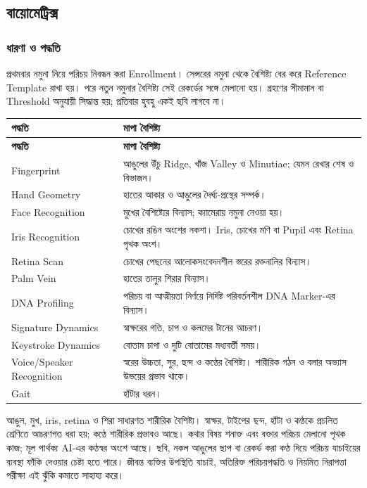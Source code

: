 \subsection{বায়োমেট্রিক্স}
\label{sec:ch1-biometrics}
\subsubsection{ধারণা ও পদ্ধতি}
প্রথমবার নমুনা নিয়ে পরিচয় নিবন্ধন করা Enrollment। সেন্সরের নমুনা থেকে বৈশিষ্ট্য বের করে Reference Template রাখা হয়। পরে নতুন নমুনার বৈশিষ্ট্য সেই রেকর্ডের সঙ্গে মেলানো হয়। গ্রহণের সীমামান বা Threshold অনুযায়ী সিদ্ধান্ত হয়; প্রতিবার হুবহু একই ছবি লাগবে না।
\begin{compacttable}
\begin{longtable}{|p{}|p{}|}
\hline\textbf{পদ্ধতি} & \textbf{মাপা বৈশিষ্ট্য}\\\hline\endfirsthead
\hline\textbf{পদ্ধতি} & \textbf{মাপা বৈশিষ্ট্য}\\\hline\endhead
Fingerprint & আঙুলের উঁচু Ridge, খাঁজ Valley ও Minutiae; যেমন রেখার শেষ ও বিভাজন।\\\hline
Hand Geometry & হাতের আকার ও আঙুলের দৈর্ঘ্য-প্রস্থের সম্পর্ক।\\\hline
Face Recognition & মুখের বৈশিষ্ট্যের বিন্যাস; ক্যামেরায় নমুনা নেওয়া হয়।\\\hline
Iris Recognition & চোখের রঙিন অংশের নকশা। Iris, চোখের মণি বা Pupil এবং Retina পৃথক অংশ।\\\hline
Retina Scan & চোখের পেছনের আলোকসংবেদনশীল স্তরের রক্তনালির বিন্যাস।\\\hline
Palm Vein & হাতের তালুর শিরার বিন্যাস।\\\hline
DNA Profiling & পরিচয় বা আত্মীয়তা নির্ণয়ে নির্দিষ্ট পরিবর্তনশীল DNA Marker-এর বিন্যাস।\\\hline
Signature Dynamics & স্বাক্ষরের গতি, চাপ ও কলমের টানের আচরণ।\\\hline
Keystroke Dynamics & বোতাম চাপা ও দুটি বোতামের মধ্যবর্তী সময়।\\\hline
Voice/Speaker Recognition & স্বরের উচ্চতা, সুর, ছন্দ ও কণ্ঠের বৈশিষ্ট্য। শারীরিক গঠন ও বলার অভ্যাস উভয়ের প্রভাব থাকে।\\\hline
Gait & হাঁটার ধরন।\\\hline
\end{longtable}
\end{compacttable}
আঙুল, মুখ, iris, retina ও শিরা সাধারণত শারীরিক বৈশিষ্ট্য। স্বাক্ষর, টাইপের ছন্দ, হাঁটা ও কণ্ঠকে প্রচলিত শ্রেণিতে আচরণগত ধরা হয়; কণ্ঠে শারীরিক প্রভাবও আছে। কথার বিষয় শনাক্ত এবং বক্তার পরিচয় মেলানো পৃথক কাজ; মূল পার্থক্য AI-এর কণ্ঠস্বর অংশে আছে।
ছবি, নকল আঙুলের ছাপ বা রেকর্ড করা কণ্ঠ দিয়ে পরিচয় যাচাইয়ের ব্যবস্থা ফাঁকি দেওয়ার চেষ্টা হতে পারে। জীবন্ত ব্যক্তির উপস্থিতি যাচাই, অতিরিক্ত পরিচয়পদ্ধতি ও নিয়মিত নিরাপত্তা পরীক্ষা এই ঝুঁকি কমাতে সাহায্য করে।
